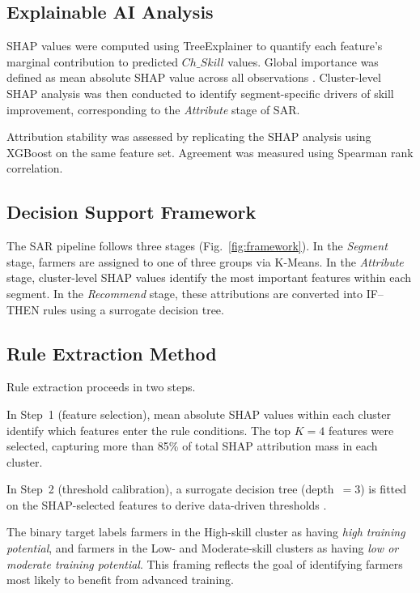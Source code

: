 \documentclass[3p,twocolumn,authoryear]{elsarticle}
\begin{document}
\subsection{Explainable AI Analysis}

SHAP values were computed using TreeExplainer \citep{lundberg2017} to
quantify each feature's marginal contribution to predicted
$Ch\_Skill$ values.
Global importance was defined as mean absolute SHAP value across all
observations \citep{lundberg2020}.
Cluster-level SHAP analysis was then conducted to identify segment-specific
drivers of skill improvement, corresponding to the \textit{Attribute}
stage of SAR.

Attribution stability was assessed by replicating the SHAP analysis
using XGBoost \citep{chen2016} on the same feature set.
Agreement was measured using Spearman rank correlation.

\subsection{Decision Support Framework}

The SAR pipeline follows three stages (Fig.~\ref{fig:framework}).
In the \textit{Segment} stage, farmers are assigned to one of three
groups via K-Means.
In the \textit{Attribute} stage, cluster-level SHAP values identify the
most important features within each segment.
In the \textit{Recommend} stage, these attributions are converted into
IF--THEN rules using a surrogate decision tree.

\subsection{Rule Extraction Method}

Rule extraction proceeds in two steps.

In Step~1 (feature selection), mean absolute SHAP values within each
cluster identify which features enter the rule conditions.
The top $K = 4$ features were selected, capturing more than 85\% of
total SHAP attribution mass in each cluster.

In Step~2 (threshold calibration), a surrogate decision tree (depth~$= 3$)
is fitted on the SHAP-selected features to derive data-driven thresholds
\citep{guidotti2019,molnar2022}.

The binary target labels farmers in the High-skill cluster as having
\textit{high training potential}, and farmers in the Low- and
Moderate-skill clusters as having \textit{low or moderate training
potential}.
This framing reflects the goal of identifying farmers most likely to
benefit from advanced training.
\end{document}
